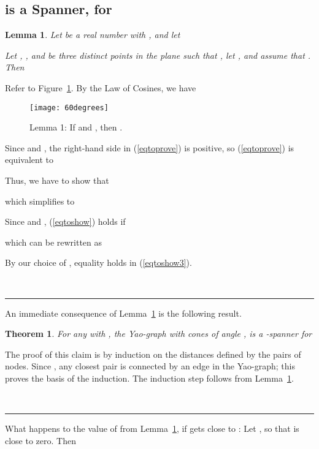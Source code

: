 \pdfoutput=1  \documentclass[11pt]{article}
\newtheorem{lemma}{Lemma}
\newtheorem{theorem}{Theorem}
\newcommand{\qed}{\rule{0.5em}{1.5ex}}
\newcommand{\fqed}{{\hfill~\qed}}
\newenvironment{proof}{{\noindent \bf Proof.}}
                      {{\hfill \fqed} \vspace{1em}}
\begin{document}
\subsection{ is a Spanner, for }
\begin{lemma}
Let  be a real number with , and let

Let , , and  be three distinct points in the plane such that
, let , and assume that
. Then

\label{lem:60degrees}
\end{lemma}
\begin{proof}
Refer to Figure~\ref{fig:60degrees}. By the Law of Cosines, we have

\begin{figure}[htbp]
\centering
\texttt{[image: 60degrees]}
\caption{Lemma 1: If  and , then .}
\label{fig:60degrees}
\end{figure}
Since  and , the right-hand side in
(\ref{eqtoprove}) is positive, so (\ref{eqtoprove}) is equivalent
to

Thus, we have to show that

which simplifies to

Since  and ,
(\ref{eqtoshow}) holds if

which can be rewritten as

By our choice of , equality holds in (\ref{eqtoshow3}).
\end{proof}

\noindent
An immediate consequence of Lemma~\ref{lem:60degrees} is the
following result.
\begin{theorem}
For any  with , the Yao-graph with cones of angle
, is a -spanner for

\label{thm:Y6}
\end{theorem}
\begin{proof}
The proof of this claim is by induction on the distances defined by
the  pairs of nodes. Since , any closest
pair is connected by an edge in the Yao-graph; this proves the
basis of the induction. The induction step follows from
Lemma~\ref{lem:60degrees}.
\end{proof}

What happens to the value of  from Lemma~\ref{lem:60degrees},
if  gets close to :
Let , so that  is close to zero.
Then
\end{document}
